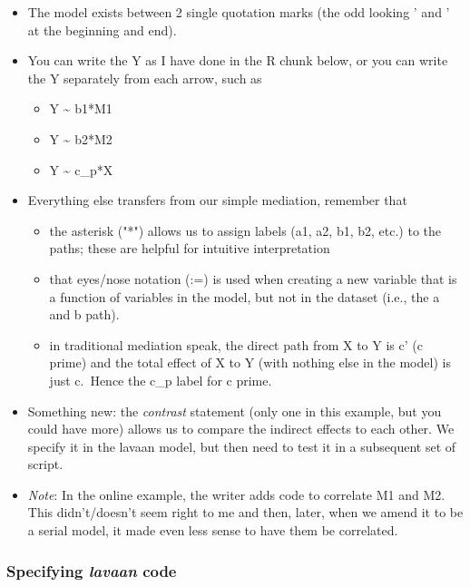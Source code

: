 \documentclass[
  english,
]{book}
\providecommand{\tightlist}{%
  \setlength{\itemsep}{0pt}\setlength{\parskip}{0pt}}
\begin{document}
\begin{itemize}
\item
  The model exists between 2 single quotation marks (the odd looking ' and ' at the beginning and end).
\item
  You can write the Y as I have done in the R chunk below, or you can write the Y separately from each arrow, such as

  \begin{itemize}
  \tightlist
  \item
    Y \textasciitilde{} b1*M1
  \item
    Y \textasciitilde{} b2*M2
  \item
    Y \textasciitilde{} c\_p*X
  \end{itemize}
\item
  Everything else transfers from our simple mediation, remember that

  \begin{itemize}
  \tightlist
  \item
    the asterisk ("*") allows us to assign labels (a1, a2, b1, b2, etc.) to the paths; these are helpful for intuitive interpretation
  \item
    that eyes/nose notation (:=) is used when creating a new variable that is a function of variables in the model, but not in the dataset (i.e., the a and b path).
  \item
    in traditional mediation speak, the direct path from X to Y is c' (c prime) and the total effect of X to Y (with nothing else in the model) is just c.~Hence the c\_p label for c prime.
  \end{itemize}
\item
  Something new: the \emph{contrast} statement (only one in this example, but you could have more) allows us to compare the indirect effects to each other. We specify it in the lavaan model, but then need to test it in a subsequent set of script.
\item
  \emph{Note}: In the online example, the writer adds code to correlate M1 and M2. This didn't/doesn't seem right to me and then, later, when we amend it to be a serial model, it made even less sense to have them be correlated.
\end{itemize}

\hypertarget{specifying-lavaan-code}{%
\subsubsection{\texorpdfstring{Specifying \emph{lavaan} code}{Specifying lavaan code}}\label{specifying-lavaan-code}}
\end{document}
